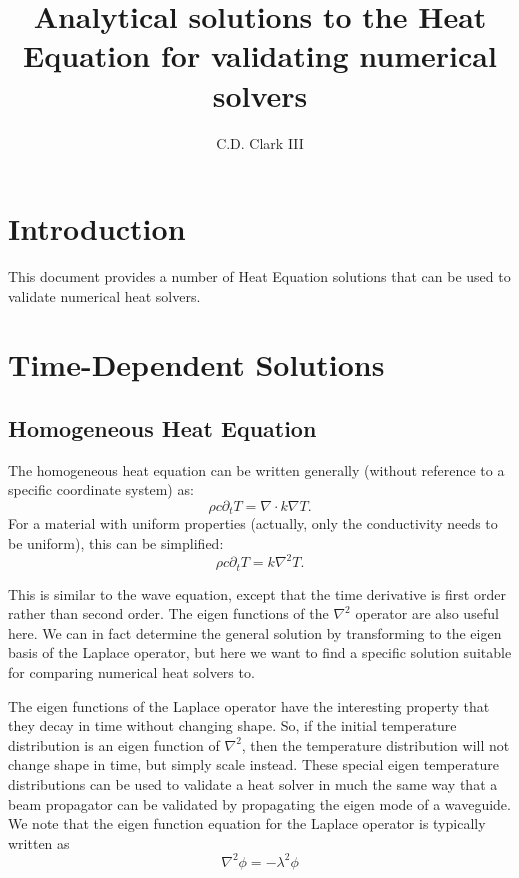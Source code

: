 \documentclass[letterpaper,12pt]{article}
\title{Analytical solutions to the Heat Equation for validating numerical solvers}
\author{C.D. Clark III}
\begin{document}
\maketitle

\section{Introduction}
\label{sec:intro}
This document provides a number of Heat Equation solutions that can be used to validate numerical heat solvers. 

\section{Time-Dependent Solutions}

\subsection{Homogeneous Heat Equation}

The homogeneous heat equation can be written generally (without reference to a specific coordinate system) as:
\begin{equation}
  \label{eq:hom_heat_eq}
  \rho c \partial_t T = \nabla \cdot k \nabla T.
\end{equation}
For a material with uniform properties (actually, only the conductivity needs to be uniform), this can be simplified:
\begin{equation}
  \label{eq:simp_hom_heat_eq}
  \rho c \partial_t T = k \nabla^2 T.
\end{equation}

This is similar to the wave equation, except that the time derivative is first order rather than second order. The eigen functions of
the $\nabla^2$ operator are also useful here. We can in fact determine the general solution by transforming to the eigen basis of
the Laplace operator, but here we want to find a specific solution suitable for comparing numerical heat solvers to.

The eigen functions of the Laplace operator have the interesting property that they decay in time without changing shape. So, if the initial
temperature distribution is an eigen function of $\nabla^2$, then the temperature distribution will not change shape in time, but simply
scale instead. These special eigen temperature distributions can be used to validate a heat solver in much the same way that a beam propagator
can be validated by propagating the eigen mode of a waveguide. We note that the eigen function equation for the Laplace operator is typically
written as
\begin{equation}
  \nabla^2 \phi = -\lambda^2 \phi
\end{equation}
\end{document}
